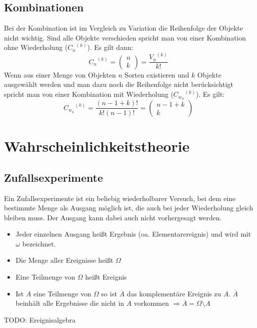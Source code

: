 \documentclass[a4paper]{scrartcl}
\begin{document}
        \subsection{Kombinationen}
            Bei der Kombination ist im Vergleich zu Variation die Reihenfolge der Objekte nicht wichtig. Sind alle Objekte verschieden spricht man 
            von einer Kombination ohne Wiederholung (\({C_n}^{(k)}\)). Es gilt dann:
            \begin{equation*}
                {C_n}^{(k)} = \begin{pmatrix}
                                n \\ k 
                              \end{pmatrix}
                                                  = \frac{{V_n}^{(k)}}{k!}
            \end{equation*}
            Wenn aus einer Menge von Objekten \(n\) Sorten existieren und \(k\) Objekte ausgewählt werden und man dazu noch die Reihenfolge nicht berücksichtigt 
            spricht man von einer Kombination mit Wiederholung (\( {C_{w_n}}^{(k)} \)). Es gilt:
            \begin{equation*}
                {C_{w_n}}^{(k)} = \frac{(n-1+k)!}{k!(n-1)!} = \begin{pmatrix} n-1 + k \\ k  \end{pmatrix}
            \end{equation*}

    \section{Wahrscheinlichkeitstheorie}
        \subsection{Zufallsexperimente}
            Ein Zufallsexperimente ist ein beliebig wiederholbarer Versuch, bei dem eine bestimmte Menge als Ausgang möglich ist, die auch bei jeder Wiederholung gleich bleiben muss.
            Der Ausgang kann dabei auch nicht vorhergesagt werden.
            \begin{itemize}
                \item Jeder einzelnen Ausgang heißt Ergebnis (oa. Elementarereignis) und wird mit \(\omega\) bezeichnet.
                \item Die Menge aller Ereignisse heißt \(\Omega\)
                \item Eine Teilmenge von \(\Omega\) heißt Ereignis
                \item Ist \(A\) eine Teilmenge von \(\Omega\) so ist \(\overline{A}\) das komplementäre Ereignis zu \(A\). \(\overline{A}\) beinhält alle Ergebnisse die nicht in \(A\)
                    vorkommen \(\Rightarrow \overline{A} = \Omega \setminus A\)
            \end{itemize}  
            TODO: Ereignisalgebra
\end{document}
